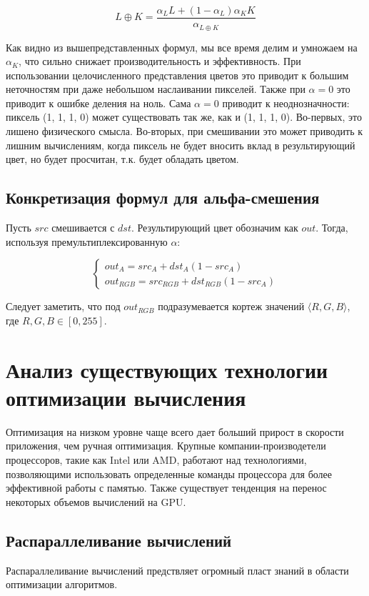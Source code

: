 \begin{equation}
L \oplus K = \frac{\alpha_{L}L + (1-\alpha_{L})\alpha_{K}K}{\alpha_{L \oplus K}}
\end{equation}

Как видно из вышепредставленных формул, мы все время делим и умножаем на $\alpha_{K}$, что сильно снижает производительность и эффективность. При использовании целочисленного представления цветов это приводит к большим неточностям при даже небольшом наслаивании пикселей. Также при $\alpha = 0$ это приводит к ошибке деления на ноль. Сама $\alpha = 0$ приводит к неоднозначности: пиксель (1, 1, 1, 0) может существовать так же, как и (1, 1, 1, 0). Во-первых, это лишено физического смысла. Во-вторых, при смешивании это может приводить к лишним вычислениям, когда пиксель не будет вносить вклад в результирующий цвет, но будет просчитан, т.к. будет обладать цветом. 

\subsection{Конкретизация формул для альфа-смешения}
Пусть $src$ смешивается с $dst$. Результирующий цвет обозначим как $out$.
Тогда, используя премультиплексированную $\alpha$: 

\begin{equation}
\begin{cases} out_{A} = src_{A} + dst_{A}(1-src_{A}) \\
out_{RGB} = src_{RGB} + dst_{RGB}(1-src_{A})
\end{cases}
\end{equation}

Следует заметить, что под $out_{RGB}$  подразумевается кортеж значений $\langle R, G, B\rangle$, где $R, G, B \in [0, 255]$.

\section{Анализ существующих технологии оптимизации вычисления}
Оптимизация на низком уровне чаще всего дает больший прирост в скорости приложения, чем ручная оптимизация. Крупные компании-производетели процессоров, такие как Intel или AMD, работают над технологиями, позволяющими использовать определенные команды процессора для более эффективной работы с памятью. Также существует тенденция на перенос некоторых объемов вычислений на GPU. 

\subsection{Распараллеливание вычислений}
Распараллеливание вычислений предствляет огромный пласт знаний в области оптимизации алгоритмов. 

